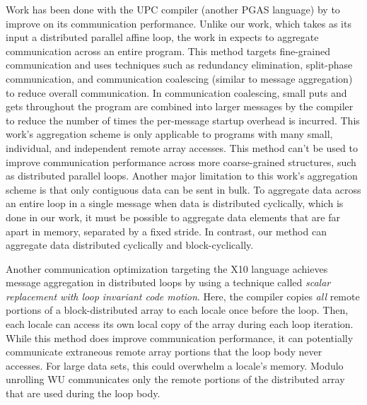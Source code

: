 Work has been done with the UPC compiler (another PGAS language) by \cite{chen2005communication} to improve on its communication performance. Unlike our work, which takes as its input a distributed parallel affine loop, the work in \cite{chen2005communication} expects to aggregate communication across an entire program. This method targets fine-grained communication and uses techniques such as redundancy elimination, split-phase communication, and communication coalescing (similar to message aggregation) to reduce overall communication. In communication coalescing, small puts and gets throughout the program are combined into larger messages by the compiler to reduce the number of times the per-message startup overhead is incurred. This work's aggregation scheme is only applicable to programs with many small, individual, and independent remote array accesses. This method can't be used to improve communication performance across more coarse-grained structures, such as distributed parallel loops. Another major limitation to this work's aggregation scheme is that only contiguous data can be sent in bulk. To aggregate data across an entire loop in a single message when data is distributed cyclically, which is done in our work, it must be possible to aggregate data elements that are far apart in memory, separated by a fixed stride. In contrast, our method can aggregate data distributed cyclically and block-cyclically.

Another communication optimization targeting the X10 language \cite{barik2011communication} achieves message aggregation in distributed loops by using a technique called \textit{scalar replacement with loop invariant code motion}. Here, the compiler copies \textit{all} remote portions of a block-distributed array to each locale once before the loop. Then, each locale can access its own local copy of the array during each loop iteration. While this method does improve communication performance, it can potentially communicate extraneous remote array portions that the loop body never accesses. For large data sets, this could overwhelm a locale's memory. Modulo unrolling WU communicates only the remote portions of the distributed array that are used during the loop body. 

\begin{comment}
\cite{callahan1988compiling}
\cite{chamberlain1998zpl}
\cite{chamberlain1997factor}
\cite{chavarria2005effective}
\cite{davidson1995improving}
\cite{Dion96compilingaffine}
\cite{germain1995automatic}
\cite{Gupta91automaticdata}
\cite{gupta1996compiling}
\cite{huang1994speculative}
\cite{iancu2008performance}
\cite{li1991data}
\cite{pouchet2011loop}
\cite{ramanujam1991compile}
\cite{shih2000efficient}
\cite{trifunovic2010graphite}
\cite{wei1998compiling}
\cite{chamberlain2011user}
\cite{bonachea2007proposal}
\cite{sanz2012global}
\end{comment}